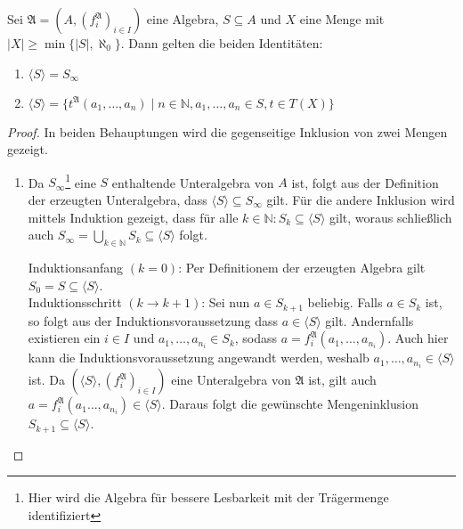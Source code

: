 \begin{proposition}
    Sei $\mathfrak{A}=(A,(f^\mathfrak{A}_i)_{i\in I})$ eine Algebra, $S\subseteq A$ und $X$ eine Menge mit $\vert X \vert \ge \min\{\vert S \vert, \aleph_0\}$. Dann gelten die beiden Identitäten:
    \begin{enumerate}
        \item $\langle S\rangle=S_\infty$
        \item $\langle S\rangle=\{t^\mathfrak{A}(a_1,\ldots,a_n) \mid n \in \mathbb{N}, a_1,\ldots,a_n\in S, t \in T(X) \}$
    \end{enumerate}
\end{proposition}
\begin{proof} In beiden Behauptungen wird die gegenseitige Inklusion von zwei Mengen gezeigt.
    \begin{enumerate}
        \item Da $S_\infty$\footnote{Hier wird die Algebra für bessere Lesbarkeit mit der Trägermenge identifiziert} eine $S$ enthaltende Unteralgebra von $A$ ist, folgt aus der Definition der
        erzeugten Unteralgebra, dass $\langle S\rangle\subseteq S_\infty$ gilt.
        Für die andere Inklusion wird mittels Induktion gezeigt, dass für alle $k\in\mathbb{N}:S_k\subseteq \langle S\rangle$ gilt,
        woraus schließlich auch $S_\infty=\bigcup_{k\in\mathbb{N}}S_k\subseteq \langle S\rangle$ folgt.

        Induktionsanfang $(k=0)$: Per Definitionem der erzeugten Algebra gilt $S_0=S\subseteq \langle S\rangle$. \\
        Induktionsschritt $(k\to k+1)$: Sei nun $a\in S_{k+1}$ beliebig. Falls $a\in S_k$ ist, so folgt aus
        der Induktionsvoraussetzung dass $a\in \langle S\rangle$ gilt. Andernfalls existieren ein $i\in I$ und
        $a_1,\ldots,a_{n_i}\in S_{k}$, sodass $a=f_i^{\mathfrak{A}}(a_1,\ldots,a_{n_i})$. Auch hier kann die Induktionsvoraussetzung
        angewandt werden, weshalb $a_1,\ldots,a_{n_i}\in \langle S\rangle$ ist. Da $(\langle S\rangle,(f_i^{\mathfrak{A}})_{i\in I})$ eine Unteralgebra
        von $\mathfrak{A}$ ist, gilt auch $a=f_i^{\mathfrak{A}}(a_1\ldots,a_{n_i})\in\langle S\rangle$. Daraus folgt die gewünschte Mengeninklusion
        $S_{k+1}\subseteq \langle S\rangle$.


\end{enumerate}
\end{proof}
